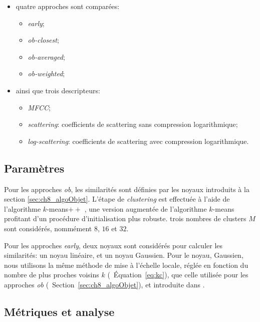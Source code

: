 \begin{itemize}

\item quatre approches sont comparées:

\begin{itemize}
\item \emph{early};
\item \emph{ob-closest};
\item \emph{ob-averaged};
\item \emph{ob-weighted};
\end{itemize}

\item ainsi que trois descripteurs:

\begin{itemize}
\item \emph{MFCC};
\item \emph{scattering}: coefficients de scattering sans compression logarithmique;
\item \emph{log-scattering}: coefficients de scattering avec compression logarithmique.
\end{itemize}
 
\end{itemize}

\subsection{Paramètres}

Pour les approches \emph{ob}, les similarités sont définies par les noyaux introduits à la section \ref{sec:ch8_algoObjet}. L'étape de \emph{clustering} est effectuée à l'aide de l'algorithme $k$-means$++$ \citep{arthur2007k}, une version augmentée de l'algorithme $k$-means profitant d'un procédure d'initialisation plus robuste. trois nombres de clusters $M$ sont considérés, nommément $8$, $16$ et $32$.

Pour les approches \emph{early}, deux noyaux sont considérés pour calculer les similarités: un noyau linéaire, et un noyau Gaussien. Pour le noyau, Gaussien, nous utilisons la même méthode de mise à l'échelle locale, réglée en fonction du nombre de plus proches voisins $k$ (\cf~Équation~\ref{eq:kc}), que celle utilisée pour les approches \emph{ob} (\cf~Section~\ref{sec:ch8_algoObjet}), et introduite dans \citep{selfTuneManor2004}.

\subsection{Métriques et analyse}
 
